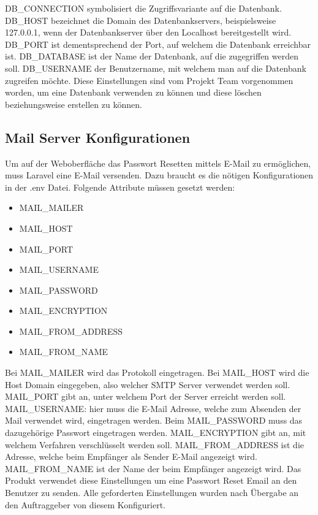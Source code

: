 DB\_CONNECTION symbolisiert die Zugriffsvariante auf die Datenbank. DB\_HOST bezeichnet die Domain des Datenbankservers, beispielsweise 127.0.0.1, wenn der Datenbankserver über den Localhost bereitgestellt wird. DB\_PORT ist dementsprechend der Port, auf welchem die Datenbank erreichbar ist. DB\_DATABASE ist der Name der Datenbank, auf die zugegriffen werden soll. DB\_USERNAME der Benutzername, mit welchem man auf die Datenbank zugreifen möchte. Diese Einstellungen sind vom Projekt Team vorgenommen worden, um eine Datenbank verwenden zu können und diese löschen beziehungsweise erstellen zu können.
\subsection{Mail Server Konfigurationen}
Um auf der Weboberfläche das Passwort Resetten mittels E-Mail zu ermöglichen, muss Laravel eine E-Mail versenden. Dazu braucht es die nötigen Konfigurationen in der .env Datei. Folgende Attribute müssen gesetzt werden: 
\begin{itemize}
	\item MAIL\_MAILER
	\item MAIL\_HOST 
	\item MAIL\_PORT 
	\item MAIL\_USERNAME 
	\item MAIL\_PASSWORD
	\item MAIL\_ENCRYPTION 
	\item MAIL\_FROM\_ADDRESS
	\item MAIL\_FROM\_NAME 
\end{itemize}
Bei MAIL\_MAILER wird das Protokoll eingetragen. Bei MAIL\_HOST wird die Host Domain  eingegeben, also welcher SMTP Server verwendet werden soll. MAIL\_PORT gibt an, unter welchem Port der Server erreicht werden soll. MAIL\_USERNAME: hier muss die E-Mail Adresse, welche zum Absenden der Mail verwendet wird, eingetragen werden. Beim MAIL\_PASSWORD muss das dazugehörige Passwort eingetragen werden. MAIL\_ENCRYPTION gibt an, mit welchem Verfahren verschlüsselt werden soll. MAIL\_FROM\_ADDRESS ist die Adresse, welche beim Empfänger als Sender E-Mail angezeigt wird. MAIL\_FROM\_NAME ist der Name der beim Empfänger angezeigt wird. Das Produkt verwendet diese Einstellungen um eine Passwort Reset Email an den Benutzer zu senden. Alle geforderten Einstellungen wurden nach Übergabe an den Auftraggeber von diesem Konfiguriert. 
\newpage
